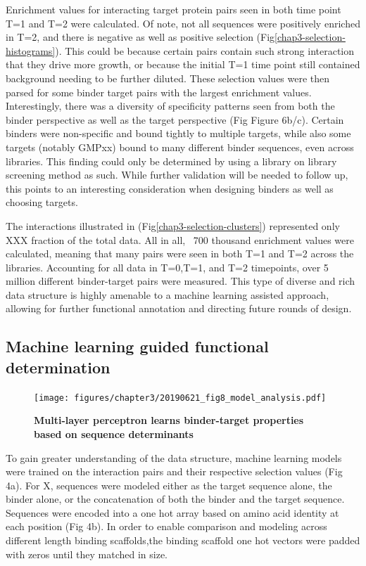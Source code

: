 Enrichment values for interacting target protein pairs seen in both time point T=1 and T=2 were calculated. Of note, not all sequences were positively enriched in T=2, and there is negative as well as positive selection (Fig\ref{chap3-selection-histograms}). This could be because certain pairs contain such strong interaction that they drive more growth, or because the initial T=1 time point still contained background needing to be further diluted. These selection values were then parsed for some binder target pairs with the largest enrichment values. Interestingly, there was a diversity of specificity patterns seen from both the binder perspective as well as the target perspective (Fig Figure 6b/c). Certain binders were non-specific and bound tightly to multiple targets, while also some targets (notably GMPxx) bound to many different binder sequences, even across libraries. This finding could only be determined by using a library on library screening method as such. While further validation will be needed to follow up, this points to an interesting consideration when designing binders as well as choosing targets. 

The interactions illustrated in (Fig\ref{chap3-selection-clusters}) represented only XXX fraction of the total data. All in all, ~700 thousand enrichment values were calculated, meaning that many pairs were seen in both T=1 and T=2 across the libraries. Accounting for all data in T=0,T=1, and T=2 timepoints, over 5 million different binder-target pairs were measured. This type of diverse and rich data structure is highly amenable to a machine learning assisted approach, allowing for further functional annotation and directing future rounds of design. 

\subsection{Machine learning guided functional determination}

\begin{figure}
\texttt{[image: figures/chapter3/20190621\_fig8\_model\_analysis.pdf]}
\caption[Multi-layer perceptron learns binder-target properties based on sequence determinants]{\textbf{Multi-layer perceptron learns binder-target properties based on sequence determinants}
\label{chap3-model}}
\end{figure}

To gain greater understanding of the data structure, machine learning models were trained on the interaction pairs and their respective selection values (Fig 4a). For X, sequences were modeled either as the target sequence alone, the binder alone, or the concatenation of both the binder and the target sequence. Sequences were encoded into a one hot array based on amino acid identity at each position (Fig 4b). In order to enable comparison and modeling across different length binding scaffolds,the binding scaffold one hot vectors were padded with zeros until they matched in size. 

